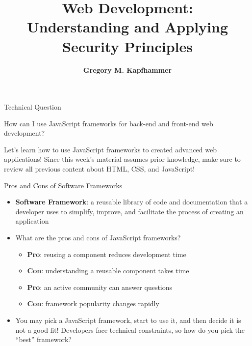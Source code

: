 \documentclass[14pt,aspectratio=169]{beamer}
\title{Web Development: \\ Understanding and Applying\\ Security Principles}
\author{{\bf Gregory M. Kapfhammer}}
\institute[shortinst]{{\bf Department of Computer Science, Allegheny College}}
\begin{document}
{
  \begin{frame}
    \titlepage
  \end{frame}
}

%
\begin{frame}{Technical Question}
  \hspace*{.15in}
  \begin{minipage}{5in}
    \vspace*{.5in}
    \begin{center}
      {\large How can I use JavaScript frameworks for back-end and front-end
      web development?}
    \end{center}
  \end{minipage}
  \vspace{1ex}
  \begin{center}
    \small Let's learn how to use JavaScript frameworks to created advanced web
    applications! Since this week's material assumes prior knowledge, make sure
    to review all previous content about HTML, CSS, and JavaScript! \\
  \end{center}
\end{frame}

%
\begin{frame}{Pros and Cons of Software Frameworks}
  \begin{itemize}
    \item {\bf Software Framework}: a reusable library of code and documentation
      that a developer uses to simplify, improve, and facilitate the process of
      creating an application
      \vspace*{-.15in}
    \item What are the pros and cons of JavaScript frameworks?
      \begin{itemize}
        \item {\bf Pro}: reusing a component reduces development time
        \item {\bf Con}: understanding a reusable component takes time
        \item {\bf Pro}: an active community can answer questions
        \item {\bf Con}: framework popularity changes rapidly
      \end{itemize}
      \vspace*{-.25in}
    \item You may pick a JavaScript framework, start to use it, and then decide
      it is not a good fit! Developers face technical constraints, so how do you
      pick the ``best'' framework?
  \end{itemize}
\end{frame}
\end{document}
